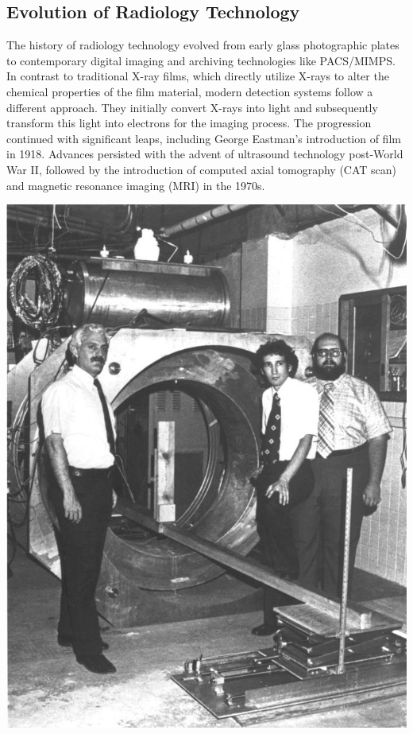 \documentclass[a4paper,12pt]{report}
\begin{document}
\subsection{Evolution of Radiology Technology}
The history of radiology technology evolved from early glass photographic plates to contemporary
digital imaging and archiving technologies like PACS/MIMPS. In contrast to traditional X-ray
films, which directly utilize X-rays to alter the chemical properties of the film material, modern
detection systems follow a different approach. They initially convert X-rays into light and
subsequently transform this light into electrons for the imaging process. The progression continued
with significant leaps, including George Eastman's introduction of film in 1918. Advances persisted
with the advent of ultrasound technology post-World War II, followed by the introduction of
computed axial tomography (CAT scan) and magnetic resonance imaging (MRI) in the 1970s.

\begin{center}
  \includegraphics[scale =0.3]{firstMRI.png}
  \label{firstMRI}
\end{center}
\end{document}

